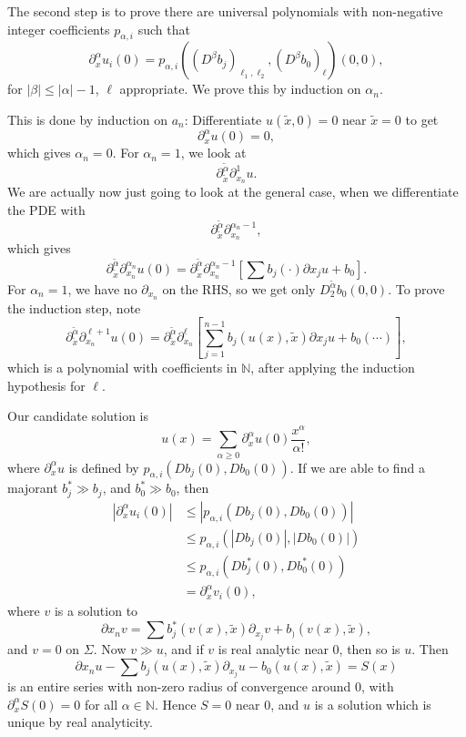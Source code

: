 \documentclass[12pt]{article}
\begin{document}
The second step is to prove there are universal polynomials with non-negative integer coefficients $p_{\alpha, i}$ such that
\[
\partial^\alpha_x u_i(0) = p_{\alpha, i} ((D^\beta b_{j})_{\ell_1, \ell_2}, (D^\beta b_0)_\ell)(0, 0),
\]
for $|\beta| \leq |\alpha| - 1$, $\ell$ appropriate. We prove this by induction on $\alpha_n$.


\begin{proofbox}
	This is done by induction on $a_n$: Differentiate $u(\tilde x, 0)= 0$ near $\tilde x = 0$ to get
	\[
	\partial^{\alpha}_x u(0) = 0,
	\]
	which gives $\alpha_n = 0$. For $\alpha_n = 1$, we look at
	\[
	\partial^{\tilde \alpha}_{\tilde x} \partial^1_{x_n} u.
	\]
	We are actually now just going to look at the general case, when we differentiate the PDE with
	\[
	\partial^{\tilde \alpha}_{\tilde x} \partial^{\alpha_n - 1}_{x_n},
	\]
	which gives
	\[
		\partial^{\tilde \alpha}_{\tilde x} \partial^{\alpha_n}_{x_n} u(0) = \partial^{\tilde \alpha}_{\tilde x} \partial^{\alpha_n - 1}_{x_n}\left[ \sum b_j (\cdot) \partial x_j u + b_0\right].
	\]
	For $\alpha_n = 1$, we have no $\partial_{x_n}$ on the RHS, so we get only $D^{\tilde \alpha}_{2}b_0(0, 0)$. To prove the induction step, note
	\[
		\partial^{\tilde \alpha}_{\tilde x} \partial^{\ell + 1}_{x_n} u(0) = \partial^{\tilde \alpha}_{\tilde x} \partial^{\ell}_{x_n} \left[ \sum_{j = 1}^{n-1} b_j(u(x), \tilde x) \partial x_j u + b_0(\cdots) \right],
	\]
	which is a polynomial with coefficients in $\mathbb{N}$, after applying the induction hypothesis for $\ell$.
\end{proofbox}

Our candidate solution is
\[
u(x) = \sum_{\alpha \geq 0} \partial^{\alpha}_x u(0) \frac{x^\alpha}{\alpha!},
\]
where $\partial^{\alpha}_x u$ is defined by $p_{\alpha, i} (D b_j(0), D b_0(0))$. If we are able to find a majorant $b_j^\ast \gg b_j$, and $b_0^\ast \gg b_0$, then
\begin{align*}
	|\partial^{\alpha}_x u_i(0)| &\leq |p_{\alpha, i} (D b_j(0), D b_0(0))| \\
				     &\leq p_{\alpha, i} (|Db_j(0)|, |Db_0(0)|) \\
				     &\leq p_{\alpha, i} (Db_j^{\ast}(0), D b_0^{\ast}(0)) \\
				     & = \partial^{\alpha}_x v_i(0),
\end{align*}
where $v$ is a solution to
\[
\partial x_n v = \sum b_j^{\ast} (v(x), \tilde x) \partial_{x_j} v + b_)(v(x), \tilde x),
\]
and $v = 0$ on $\Sigma$. Now $v \gg u$, and if $v$ is real analytic near $0$, then so is $u$. Then
\[
\partial x_n u - \sum b_j(u(x), \tilde x) \partial_{x_j} u - b_0(u(x), \tilde x) = S(x)
\]
is an entire series with non-zero radius of convergence around 0, with $\partial^{\alpha}_x S(0) = 0$ for all $\alpha \in \mathbb{N}$. Hence $S = 0$ near $0$, and $u$ is a solution which is unique by real analyticity.
\end{document}

